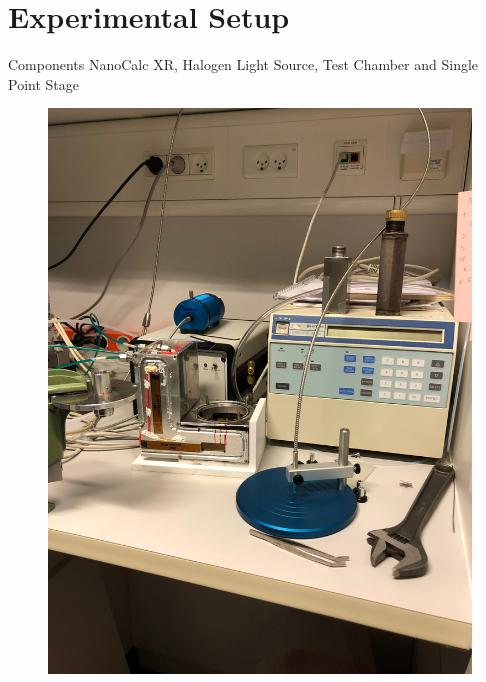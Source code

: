 \documentclass[10pt]{beamer}
\begin{document}
	
		\section{Experimental Setup}
		
		\begin{frame}{Components}
		NanoCalc XR, Halogen Light Source, Test Chamber and Single Point Stage
		
		\begin{minipage}{0.47\textwidth}
		\begin{figure}
		\includegraphics[scale=0.04,angle=-90]{setup1.JPG}
		\end{figure}
		\end{minipage}
		\begin{minipage}{0.5\textwidth}
		\begin{figure}

\end{figure}
\end{minipage}
\end{frame}
\end{document}
